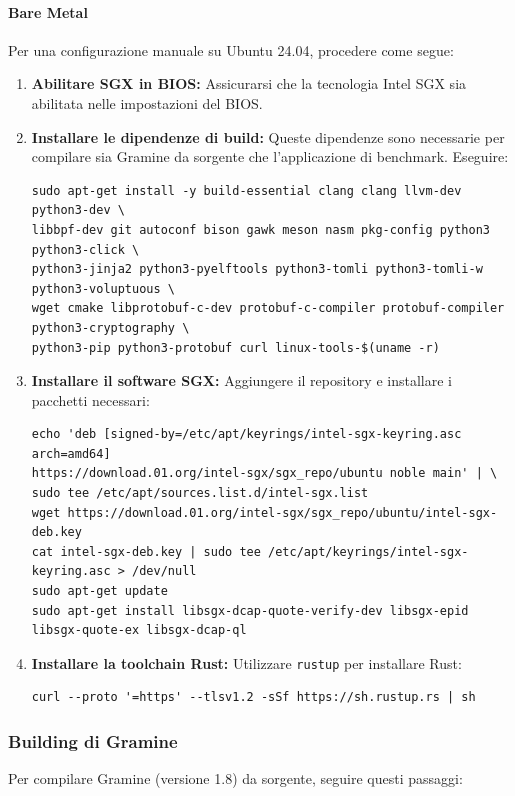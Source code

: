 \documentclass{article}
\begin{document}
\paragraph{Bare Metal}
Per una configurazione manuale su Ubuntu 24.04, procedere come segue:

\begin{enumerate}
  \item \textbf{Abilitare SGX in BIOS:} Assicurarsi che la tecnologia Intel SGX sia abilitata nelle impostazioni del BIOS.

  \item \textbf{Installare le dipendenze di build:} Queste dipendenze sono necessarie per compilare sia Gramine da sorgente che l'applicazione di benchmark. Eseguire:
  \begin{verbatim}
sudo apt-get install -y build-essential clang clang llvm-dev python3-dev \
libbpf-dev git autoconf bison gawk meson nasm pkg-config python3 python3-click \
python3-jinja2 python3-pyelftools python3-tomli python3-tomli-w python3-voluptuous \
wget cmake libprotobuf-c-dev protobuf-c-compiler protobuf-compiler python3-cryptography \
python3-pip python3-protobuf curl linux-tools-$(uname -r)
  \end{verbatim}

  \item \textbf{Installare il software SGX:} Aggiungere il repository e installare i pacchetti necessari:
  \begin{verbatim}
echo 'deb [signed-by=/etc/apt/keyrings/intel-sgx-keyring.asc arch=amd64] 
https://download.01.org/intel-sgx/sgx_repo/ubuntu noble main' | \
sudo tee /etc/apt/sources.list.d/intel-sgx.list
wget https://download.01.org/intel-sgx/sgx_repo/ubuntu/intel-sgx-deb.key
cat intel-sgx-deb.key | sudo tee /etc/apt/keyrings/intel-sgx-keyring.asc > /dev/null
sudo apt-get update
sudo apt-get install libsgx-dcap-quote-verify-dev libsgx-epid libsgx-quote-ex libsgx-dcap-ql
  \end{verbatim}

  \item \textbf{Installare la toolchain Rust:} Utilizzare \texttt{rustup} per installare Rust:
  \begin{verbatim}
curl --proto '=https' --tlsv1.2 -sSf https://sh.rustup.rs | sh
  \end{verbatim}
\end{enumerate}

\subsubsection{Building di Gramine}
Per compilare Gramine (versione 1.8) da sorgente, seguire questi passaggi:
\end{document}
